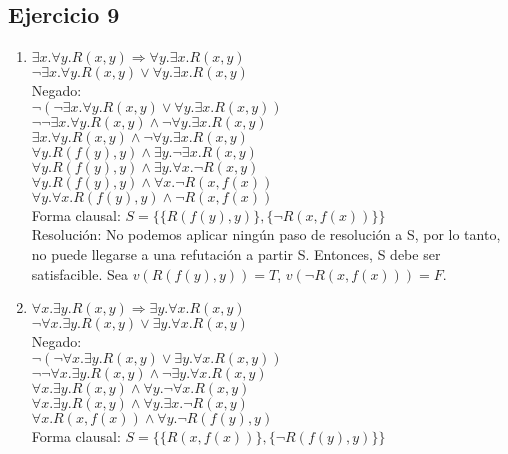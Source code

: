 \documentclass[10pt,a4paper]{article}
\begin{document}
  \subsection{Ejercicio 9}
\begin{enumerate}
\item
$\exists x. \forall y. R(x,y) \Rightarrow \forall y. \exists x. R(x,y)$ \\
$\neg \exists x. \forall y. R(x,y) \vee \forall y. \exists x. R(x,y)$ \\
Negado: \\
$\neg (\neg \exists x. \forall y. R(x,y) \vee \forall y. \exists x. R(x,y))$ \\
$ \neg \neg \exists x. \forall y. R(x,y) \wedge \neg \forall y. \exists x. R(x,y) $ \\
$ \exists x. \forall y. R(x,y) \wedge \neg \forall y. \exists x. R(x,y) $ \\
$ \forall y. R(f(y),y) \wedge \exists y. \neg \exists x. R(x,y) $ \\
$ \forall y. R(f(y),y) \wedge \exists y. \forall x. \neg R(x,y) $ \\
$ \forall y. R(f(y),y) \wedge \forall x. \neg R(x,f(x)) $ \\
$ \forall y. \forall x.  R(f(y),y) \wedge \neg R(x,f(x)) $ \\
Forma clausal: $S=\{\{ R(f(y),y)\},\{ \neg R(x,f(x))\} \}$ \\
Resolución: No podemos aplicar ningún paso de resolución a S, por lo tanto, no puede llegarse a una refutación a partir S. Entonces, S debe ser satisfacible. Sea $v(R(f(y),y))=T$, $v(\neg R(x,f(x)))=F$.
\item
$\forall x. \exists y. R(x,y) \Rightarrow \exists y. \forall x. R(x,y)$ \\
$\neg \forall x. \exists y. R(x,y) \vee \exists y. \forall x. R(x,y)$ \\
Negado: \\
$\neg (\neg \forall x. \exists y. R(x,y) \vee \exists y. \forall x. R(x,y))$ \\
$\neg \neg \forall x. \exists y. R(x,y) \wedge \neg \exists y. \forall x. R(x,y)$ \\
$\forall x. \exists y. R(x,y) \wedge \forall y. \neg \forall x. R(x,y)$ \\
$\forall x. \exists y. R(x,y) \wedge \forall y. \exists x. \neg R(x,y)$ \\
$\forall x. R(x,f(x)) \wedge \forall y. \neg R(f(y),y)$ \\
Forma clausal: $S=\{ \{ R(x,f(x))\},\{ \neg R(f(y),y) \}\}$ \\

\end{enumerate}
\end{document}
